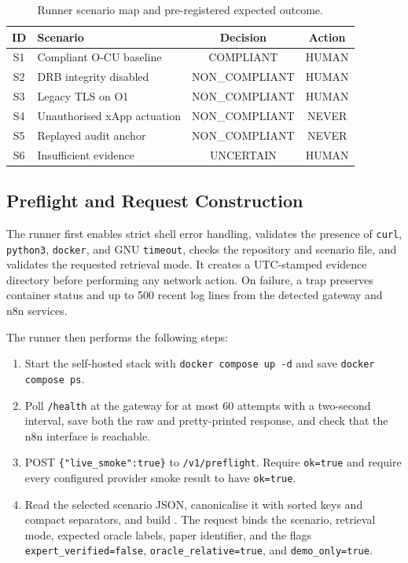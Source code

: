 \documentclass[journal]{IEEEtran}
\newcommand{\artifactpath}[1]{\path{#1}}
\begin{document}
\begin{table}[!t]
\centering
\caption{Runner scenario map and pre-registered expected outcome.}
\label{tab:scenarios}
\begin{adjustbox}{width=\columnwidth}
\begin{tabular}{cL{3.8cm}cc}
\toprule
ID & Scenario & Decision & Action \\
\midrule
S1 & Compliant O-CU baseline & COMPLIANT & HUMAN \\
S2 & DRB integrity disabled & NON\_COMPLIANT & HUMAN \\
S3 & Legacy TLS on O1 & NON\_COMPLIANT & HUMAN \\
S4 & Unauthorised xApp actuation & NON\_COMPLIANT & NEVER \\
S5 & Replayed audit anchor & NON\_COMPLIANT & NEVER \\
S6 & Insufficient evidence & UNCERTAIN & HUMAN \\
\bottomrule
\end{tabular}
\end{adjustbox}
\end{table}

\subsection{Preflight and Request Construction}
The runner first enables strict shell error handling, validates the presence
of \texttt{curl}, \texttt{python3}, \texttt{docker}, and GNU
\texttt{timeout}, checks the repository and scenario file, and validates the
requested retrieval mode. It creates a UTC-stamped evidence directory before
performing any network action. On failure, a trap preserves container status
and up to 500 recent log lines from the detected gateway and n8n services.

The runner then performs the following steps:
\begin{enumerate}
\item Start the self-hosted stack with \texttt{docker compose up -d} and save
\texttt{docker compose ps}.
\item Poll \texttt{/health} at the gateway for at most 60 attempts with a
two-second interval, save both the raw and pretty-printed response, and check
that the n8n interface is reachable.
\item POST \texttt{\{"live\_smoke":true\}} to \texttt{/v1/preflight}. Require
\texttt{ok=true} and require every configured provider smoke result to have
\texttt{ok=true}.
\item Read the selected scenario JSON, canonicalise it with sorted keys and
compact separators, and build \artifactpath{request.json}. The request binds
the scenario, retrieval mode, expected oracle labels, paper identifier, and
the flags \texttt{expert\_verified=false},
\texttt{oracle\_relative=true}, and \texttt{demo\_only=true}.
\end{enumerate}
\end{document}
